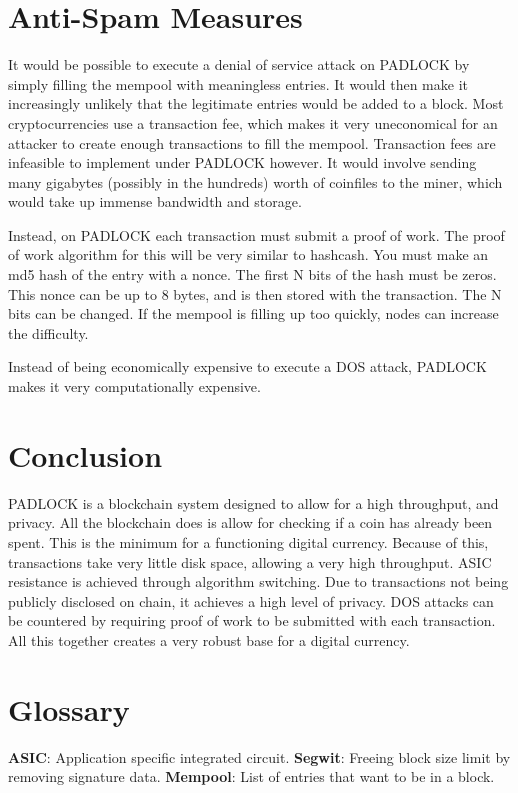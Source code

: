 \documentclass[12pt, letterpaper]{article} \usepackage[utf8]{inputenc}
\begin{document}
\section{Anti-Spam Measures} It would be possible to execute a denial of
service attack on PADLOCK by simply filling the mempool with meaningless
entries. It would then make it increasingly unlikely that the legitimate
entries would be added to a block. Most cryptocurrencies use a transaction fee,
which makes it very uneconomical for an attacker to create enough transactions
to fill the mempool. Transaction fees are infeasible to implement under PADLOCK
however. It would involve sending many gigabytes (possibly in the hundreds)
worth of coinfiles to the miner, which would take up immense bandwidth and
storage.

Instead, on PADLOCK each transaction must submit a proof of work. The proof of
work algorithm for this will be very similar to hashcash. You must make an md5
hash of the entry with a nonce. The first N bits of the hash must be zeros.
This nonce can be up to 8 bytes, and is then stored with the transaction. The N
bits can be changed. If the mempool is filling up too quickly, nodes can
increase the difficulty.

Instead of being economically expensive to execute a DOS attack, PADLOCK makes
it very computationally expensive.

\section{Conclusion} PADLOCK is a blockchain system designed to allow for a
high throughput, and privacy. All the blockchain does is allow for checking if
a coin has already been spent. This is the minimum for a functioning digital
currency. Because of this, transactions take very little disk space, allowing a
very high throughput. ASIC resistance is achieved through algorithm switching.
Due to transactions not being publicly disclosed on chain, it achieves a high
level of privacy. DOS attacks can be countered by requiring proof of work to be
submitted with each transaction. All this together creates a very robust base
for a digital currency.

\section{Glossary}

\textbf{ASIC}: Application specific integrated circuit. 
\newline{}
\textbf{Segwit}: Freeing block size limit by removing signature data.
\newline{} 
\textbf{Mempool}: List of entries that want to be in a block.
\newline{}
\end{document}
